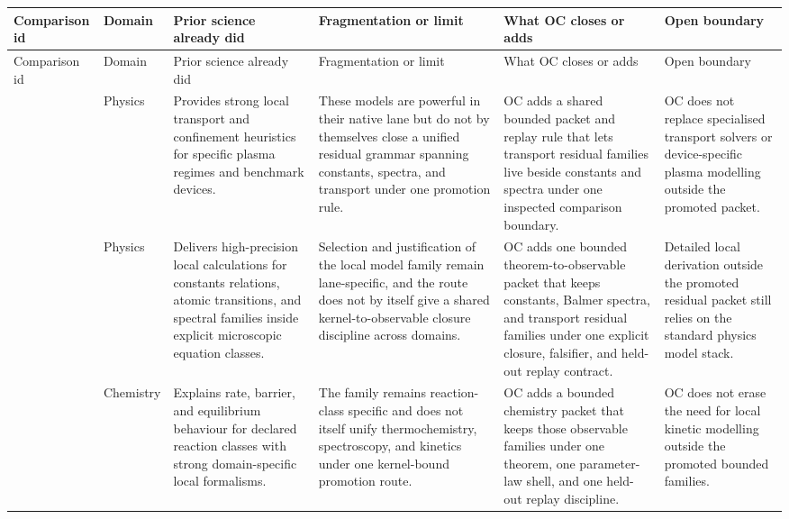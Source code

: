 \begin{longtable}{@{}L{0.17\textwidth}L{0.09\textwidth}L{0.17\textwidth}L{0.17\textwidth}L{0.20\textwidth}L{0.14\textwidth}@{}}
\toprule
Comparison id & Domain & Prior science already did & Fragmentation or limit & What OC closes or adds & Open boundary \\
\midrule
\endfirsthead
\toprule
Comparison id & Domain & Prior science already did & Fragmentation or limit & What OC closes or adds & Open boundary \\
\midrule
\endhead
{} & Physics & Provides strong local transport and confinement heuristics for specific plasma regimes and benchmark devices. & These models are powerful in their native lane but do not by themselves close a unified residual grammar spanning constants, spectra, and transport under one promotion rule. & OC adds a shared bounded packet and replay rule that lets transport residual families live beside constants and spectra under one inspected comparison boundary. & OC does not replace specialised transport solvers or device-specific plasma modelling outside the promoted packet. \\
 & Physics & Delivers high-precision local calculations for constants relations, atomic transitions, and spectral families inside explicit microscopic equation classes. & Selection and justification of the local model family remain lane-specific, and the route does not by itself give a shared kernel-to-observable closure discipline across domains. & OC adds one bounded theorem-to-observable packet that keeps constants, Balmer spectra, and transport residual families under one explicit closure, falsifier, and held-out replay contract. & Detailed local derivation outside the promoted residual packet still relies on the standard physics model stack. \\
 & Chemistry & Explains rate, barrier, and equilibrium behaviour for declared reaction classes with strong domain-specific local formalisms. & The family remains reaction-class specific and does not itself unify thermochemistry, spectroscopy, and kinetics under one kernel-bound promotion route. & OC adds a bounded chemistry packet that keeps those observable families under one theorem, one parameter-law shell, and one held-out replay discipline. & OC does not erase the need for local kinetic modelling outside the promoted bounded families. \\

\end{longtable}
